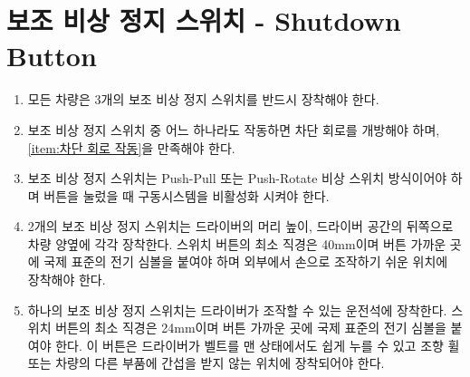 \documentclass[final,a4paper,10pt]{report}
\begin{document}
\section{보조 비상 정지 스위치 - Shutdown Button} \label{section:보조 비상 정지 스위치}
\begin{enumerate}
  \item 모든 차량은 3개의 보조 비상 정지 스위치를 반드시 장착해야 한다.
  \item 보조 비상 정지 스위치 중 어느 하나라도 작동하면 차단 회로를 개방해야 하며, \cref{item:차단 회로 작동}을 만족해야 한다.
  \item 보조 비상 정지 스위치는 Push-Pull 또는 Push-Rotate 비상 스위치 방식이어야 하며 버튼을 눌렀을 때 구동시스템을 비활성화 시켜야 한다.
  \item 2개의 보조 비상 정지 스위치는 드라이버의 머리 높이, 드라이버 공간의 뒤쪽으로 차량 양옆에 각각 장착한다. 스위치 버튼의 최소 직경은 40mm이며 버튼 가까운 곳에 국제 표준의 전기 심볼을 붙여야 하며 외부에서 손으로 조작하기 쉬운 위치에 장착해야 한다.
  \item 하나의 보조 비상 정지 스위치는 드라이버가 조작할 수 있는 운전석에 장착한다. 스위치 버튼의 최소 직경은 24mm이며 버튼 가까운 곳에 국제 표준의 전기 심볼을 붙여야 한다. 이 버튼은 드라이버가 벨트를 맨 상태에서도 쉽게 누를 수 있고 조향 휠 또는 차량의 다른 부품에 간섭을 받지 않는 위치에 장착되어야 한다.
\end{enumerate}

\end{document}
